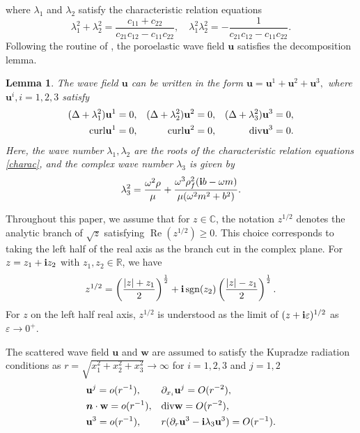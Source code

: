 \documentclass[11pt]{article}
\newcommand{\mat}{\mathbb}
\newcommand{\R}{{\mat R}}
\newcommand{\ds}{\displaystyle}
\newcommand{\pa}{\partial}
\newcommand{\dive}{{\rm div}}
\newcommand{\la}{\lambda}
\newcommand{\bs}{\boldsymbol}
\newtheorem{lemma}[theorem]{Lemma}
\begin{document}
where $\la_1$ and $\la_2$ satisfy the characteristic relation equations 
\begin{equation}\label{charac}
\la_1^2+\la_2^2=\frac{c_{11}+c_{22}}{c_{21}c_{12}-c_{11}c_{22}},\quad\la_1^2\la_2^2=
-\frac{1}{c_{21}c_{12}-c_{11}c_{22}}.
\end{equation}
Following the routine of \cite{Kupradze1979}, the poroelastic wave field $\mathbf{u}$ satisfies the decomposition lemma.
\begin{lemma}
The wave field $\mathbf{u}$ can be written in the form
$\mathbf{u}=\mathbf{u}^1+\mathbf{u}^2+\mathbf{u}^3,$
where $\mathbf{u}^i,i=1,2,3$ satisfy 
\begin{equation*}
\begin{aligned}
(\Delta +\la_1^2)\mathbf{u}^1 &=0, & (\Delta +\la_2^2)\mathbf{u}^2& =0, & (\Delta +\la_3^2)\mathbf{u}^3&=0, \\
{\rm curl}\mathbf{u}^1&=0, & {\rm curl}\mathbf{u}^2&=0, & \dive\mathbf{u}^3&=0.
\end{aligned}
\end{equation*}
Here, the wave number $\la_1,\la_2$ are the roots of the characteristic relation equations \eqref{charac}, 
and the complex wave number $\la_3$ is given by
\begin{equation*}
\la_3^2=\ds\frac{\omega^2\rho}{\mu}+\frac{\omega^3\rho_f^2({\bf{i}}b-\omega m)}{\mu(\omega^2m^2+b^2)}.
\end{equation*}
\end{lemma}
Throughout this paper, we assume that for $z\in\mathbb{C} $, the notation  $ z^{1/2} $ denotes the 
analytic branch of $\sqrt{z}$ satisfying $ \operatorname{Re}(z^{1/2})\geq 0$. This choice corresponds 
to taking the left half of the real axis as the branch cut in the complex plane.  For $z = z_1 + {\bf i} z_2$ 
with $z_1, z_2\in\R $, we have
\begin{equation}\label{z1/2}
z^{1/2} = \left(\frac{|z| + z_1}{2}\right)^{\frac{1}{2}} + {\bf i} \operatorname{sgn}(z_2)
\left(\frac{|z| - z_1}{2}\right)^{\frac{1}{2}}.
\end{equation}
For $z$ on the left half real axis, $ z^{1/2} $ is understood as the limit of  $(z + {\bf i}
 \varepsilon)^{1/2} $ as $ \varepsilon \to 0^+$.

The scattered wave field $\mathbf{u}$ and $\mathbf{w}$ are assumed to satisfy the Kupradze radiation 
conditions as $r=\sqrt{x_1^2+x_2^2+x_3^2} \rightarrow \infty$ for $i=1,2,3$ and $j=1,2$
\begin{equation}\label{Kupradze}
\begin{aligned}
&\mathbf{u}^j=o(r^{-1}), & &\pa_{x_i}\mathbf{u}^j=O(r^{-2}), \\
&\bs{n}\cdot\mathbf{w}=o(r^{-1}), & &\dive\mathbf{w}=O(r^{-2}), \\
&\mathbf{u}^3=o(r^{-1}), & &r(\pa_{r}\mathbf{u}^3-{\bf{i}}\la_3\mathbf{u}^3)=O(r^{-1}).
\end{aligned}
\end{equation}
\end{document}
